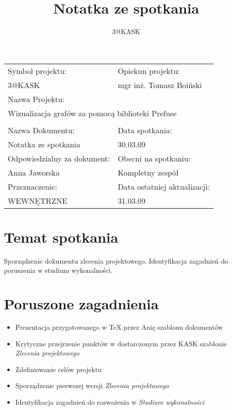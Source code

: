 \documentclass[a4paper,10pt]{article}
\title{Notatka ze spotkania}
\author{3@KASK}
\begin{document}



\maketitle


\begin{center}
\begin{tabular}{|p{7cm}|p{7cm}|}
\hline
Symbol projektu: & Opiekun projektu:   \tabularnewline 
3@KASK & mgr inż. Tomasz Boiński    \tabularnewline \hline
\multicolumn{2}{|l|}{Nazwa Projektu: } \tabularnewline
\multicolumn{2}{|l|}{Wizualizacja grafów za pomocą biblioteki Prefuse } \tabularnewline 
\hline
\multicolumn{2}{l}{ } \tabularnewline %
\hline 
Nazwa Dokumentu: & Data spotkania:   \tabularnewline 
Notatka ze spotkania & 30.03.09 \tabularnewline \hline
Odpowiedzialny za dokument: & Obecni na spotkaniu:   \tabularnewline 
Anna Jaworska  & Kompletny zespół \tabularnewline \hline
Przeznaczenie: & Data ostatniej aktualizacji:   \tabularnewline 
WEWNĘTRZNE & 31.03.09 \tabularnewline \hline
\end{tabular}
\end{center}

\section{Temat spotkania}
\paragraph{}Sporządzenie dokumentu zlecenia projektowego. Identyfikacja  zagadnień do poruszenia w studium wykonalności. 

\section{Poruszone zagadnienia}
\begin{itemize}
	\item Prezentacja przygotowanego w TeX przez Anię szablonu dokumentów 
	\item Krytyczne przejrzenie punktów w dostarczonym przez KASK szablonie \textit{Zlecenia projektowego}
	\item Zdefiniowanie celów projektu
	\item Sporządzenie pierwszej wersji \textit{Zlecenia projektowego}
	\item Identyfikacja zagadnień do rozważenia w \textit{Studium wykonalności}
\end{itemize}
\end{document}

